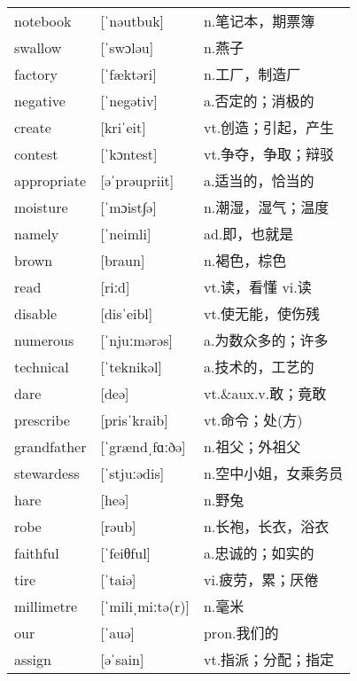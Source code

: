 \documentclass[a4paper]{article}
\begin{document}
\section{}
\begin{tabular}{l l l}

notebook & [ˈnəutbuk] & n.笔记本，期票簿 \\
swallow & [ˈswɔləu] & n.燕子 \\
factory & [ˈfæktəri] & n.工厂，制造厂 \\
negative & [ˈnegətiv] & a.否定的；消极的 \\
create & [kriˈeit] & vt.创造；引起，产生 \\
contest & [ˈkɔntest] & vt.争夺，争取；辩驳 \\
appropriate & [əˈprəupriit] & a.适当的，恰当的 \\
moisture & [ˈmɔist∫ə] & n.潮湿，湿气；温度 \\
namely & [ˈneimli] & ad.即，也就是 \\
brown & [braun] & n.褐色，棕色 \\
read & [riːd] & vt.读，看懂 vi.读 \\
disable & [disˈeibl] & vt.使无能，使伤残 \\
numerous & [ˈnjuːmərəs] & a.为数众多的；许多 \\
technical & [ˈteknikəl] & a.技术的，工艺的 \\
dare & [deə] & vt.\&aux.v.敢；竟敢 \\
prescribe & [prisˈkraib] & vt.命令；处(方) \\
grandfather & [ˈgrændˌfɑːðə] & n.祖父；外祖父 \\
stewardess & [ˈstjuːədis] & n.空中小姐，女乘务员 \\
hare & [heə] & n.野兔 \\
robe & [rəub] & n.长袍，长衣，浴衣 \\
faithful & [ˈfeiθful] & a.忠诚的；如实的 \\
tire & [ˈtaiə] & vi.疲劳，累；厌倦 \\
millimetre & [ˈmiliˌmiːtə(r)] & n.毫米 \\
our & [ˈauə] & pron.我们的 \\
assign & [əˈsain] & vt.指派；分配；指定 \\

\end{tabular}
\end{document}
